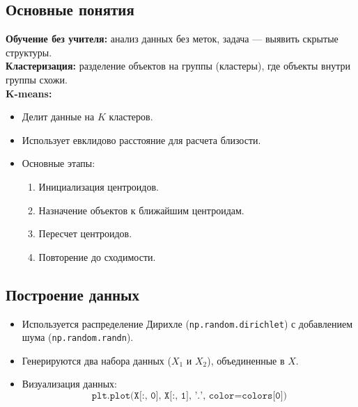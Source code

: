 \subsection*{Основные понятия}
\textbf{Обучение без учителя:} анализ данных без меток, задача — выявить скрытые структуры.\\
\textbf{Кластеризация:} разделение объектов на группы (кластеры), где объекты внутри группы схожи.\\
\textbf{K-means:}
\begin{itemize}
    \item Делит данные на $K$ кластеров.
    \item Использует евклидово расстояние для расчета близости.
    \item Основные этапы:
          \begin{enumerate}
              \item Инициализация центроидов.
              \item Назначение объектов к ближайшим центроидам.
              \item Пересчет центроидов.
              \item Повторение до сходимости.
          \end{enumerate}
\end{itemize}

\subsection*{Построение данных}
\begin{itemize}
    \item Используется распределение Дирихле (\texttt{np.random.dirichlet}) с добавлением шума (\texttt{np.random.randn}).
    \item Генерируются два набора данных ($X_1$ и $X_2$), объединенные в $X$.
    \item Визуализация данных:
          \[
              \texttt{plt.plot(X[:, 0], X[:, 1], '.', color=colors[0])}
          \]
\end{itemize}

